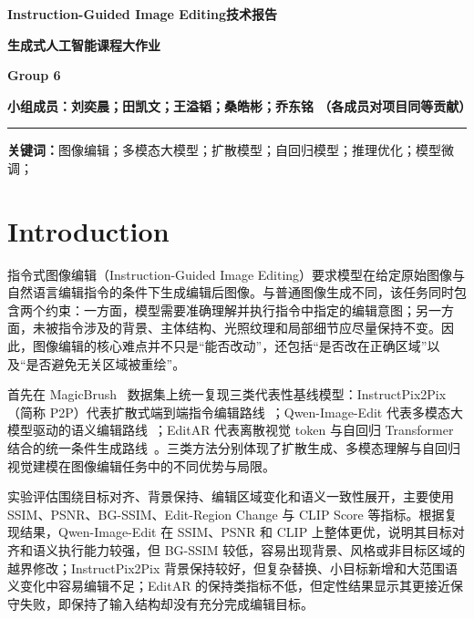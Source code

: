 \documentclass[UTF8,11pt,a4paper,fontset=fandol]{ctexart}
\newcommand{\reporttitle}{Instruction-Guided Image Editing技术报告}
\newcommand{\keywords}[1]{\par\begin{center}\textbf{关键词：}#1\end{center}}
\newcommand{\makefrontmatter}{%
  \thispagestyle{plain}
  \begin{center}
    {\zihao{2}\bfseries \reporttitle\par}
    \vspace{0.35em}
    {\zihao{4}\bfseries 生成式人工智能课程大作业\par}
    \vspace{0.35em}
    {\zihao{4}\bfseries Group 6\par}
  \end{center}
  \vspace{0.65em}
  \begin{center}
    {\small\bfseries 小组成员：刘奕晨；田凯文；王溢韬；桑皓彬；乔东铭 （各成员对项目同等贡献）\par}
  \end{center}
  \vspace{0.45em}
  \hrule
  \vspace{0.85em}
}
\begin{document}
\makefrontmatter

\tableofcontents
\vspace{0.8em}

\begin{abstract}
图像编辑（Image Editing）任务以原始图像和自然语言编辑指令作为输入，输出修改后的图像。该任务不仅要求模型改对，还要求未被指令涉及的区域尽量保持不变。围绕这一目标，本报告首先对 InstructPix2Pix、Qwen-Image-Edit 与 EditAR 三类代表性基线进行统一复现，并在 MagicBrush 开发集样例上进行评估。针对三种基线模型的不足，我们进行如下改进：基于训练的方法，通过减少采样步数加速模型推理，对于背景退化问题，我们设计了adapter学习低步数到高步数到修正，在加速到同时保证编辑效果，我们设计进行了lora微调，通过基本的真值作为优化目标到增强mask约束到混合专家，指标和编辑效果均有提升；基于推理的方法，我们通过prompt改写加多参数候选，mask裁剪和背景融合三种策略，使推理结果专注修改区域，最后进一步进行图层分解，分层编辑来优化编辑效果。
\end{abstract}
\keywords{图像编辑；多模态大模型；扩散模型；自回归模型；推理优化；模型微调；}

\vspace{0.8em}

\section{Introduction}

指令式图像编辑（Instruction-Guided Image Editing）要求模型在给定原始图像与自然语言编辑指令的条件下生成编辑后图像。与普通图像生成不同，该任务同时包含两个约束：一方面，模型需要准确理解并执行指令中指定的编辑意图；另一方面，未被指令涉及的背景、主体结构、光照纹理和局部细节应尽量保持不变。因此，图像编辑的核心难点并不只是“能否改动”，还包括“是否改在正确区域”以及“是否避免无关区域被重绘”。

首先在 MagicBrush~\cite{magicbrush} 数据集上统一复现三类代表性基线模型：InstructPix2Pix（简称 P2P）代表扩散式端到端指令编辑路线~\cite{instructpix2pix}；Qwen-Image-Edit 代表多模态大模型驱动的语义编辑路线~\cite{qwenimage}；EditAR 代表离散视觉 token 与自回归 Transformer 结合的统一条件生成路线~\cite{editar}。三类方法分别体现了扩散生成、多模态理解与自回归视觉建模在图像编辑任务中的不同优势与局限。

实验评估围绕目标对齐、背景保持、编辑区域变化和语义一致性展开，主要使用 SSIM、PSNR、BG-SSIM、Edit-Region Change 与 CLIP Score 等指标。根据复现结果，Qwen-Image-Edit 在 SSIM、PSNR 和 CLIP 上整体更优，说明其目标对齐和语义执行能力较强，但 BG-SSIM 较低，容易出现背景、风格或非目标区域的越界修改；InstructPix2Pix 背景保持较好，但复杂替换、小目标新增和大范围语义变化中容易编辑不足；EditAR 的保持类指标不低，但定性结果显示其更接近保守失败，即保持了输入结构却没有充分完成编辑目标。
\end{document}
